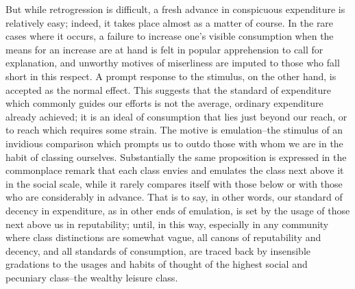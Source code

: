 \documentclass[12pt]{report}
\begin{document}
But while retrogression is difficult, a fresh advance in conspicuous
expenditure is relatively easy; indeed, it takes place almost as a
matter of course. In the rare cases where it occurs, a failure to
increase one's visible consumption when the means for an increase are
at hand is felt in popular apprehension to call for explanation, and
unworthy motives of miserliness are imputed to those who fall short in
this respect. A prompt response to the stimulus, on the other hand,
is accepted as the normal effect. This suggests that the standard
of expenditure which commonly guides our efforts is not the average,
ordinary expenditure already achieved; it is an ideal of consumption
that lies just beyond our reach, or to reach which requires some strain.
The motive is emulation--the stimulus of an invidious comparison which
prompts us to outdo those with whom we are in the habit of classing
ourselves. Substantially the same proposition is expressed in the
commonplace remark that each class envies and emulates the class next
above it in the social scale, while it rarely compares itself with those
below or with those who are considerably in advance. That is to say, in
other words, our standard of decency in expenditure, as in other ends of
emulation, is set by the usage of those next above us in reputability;
until, in this way, especially in any community where class distinctions
are somewhat vague, all canons of reputability and decency, and all
standards of consumption, are traced back by insensible gradations to
the usages and habits of thought of the highest social and pecuniary
class--the wealthy leisure class.
\end{document}
